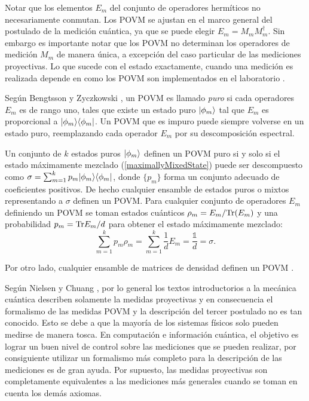 Notar que los elementos $E_m$ del conjunto de operadores hermíticos no necesariamente conmutan. Los POVM se ajustan en el marco general del
postulado de la medición cuántica, ya que se puede elegir $E_m=M_m
M_m^{\dagger}$. Sin embargo es importante notar que los POVM no determinan los
operadores de medición $M_m$ de manera única, a excepción del caso particular
de las mediciones proyectivas. Lo que sucede con el estado exactamente, cuando
una medición es realizada depende en como los POVM son implementados en el
laboratorio {\cite{2007geometry}}.   

Según Bengtsson y Zyczkowski {\cite{2007geometry}}, un POVM es llamado \textit{puro} si cada operadores $E_m$ es de rango uno, tales que existe un estado puro $|\phi_m\rangle$ tal que $E_m$ es proporcional a $|\phi_m\rangle \langle\phi_m|$. Un POVM que es impuro puede siempre volverse en un estado puro, reemplazando cada operador $E_m$ por su descomposición espectral. 

Un conjunto de $k$ estados puros $|\phi_m \rangle$ definen un POVM puro si y solo si el estado máximamente mezclado (\ref{maximallyMixedState}) puede ser descompuesto como  $\sigma=\sum_{m=1}^{k}p_m|\phi_m\rangle \langle\phi_m|$, donde $\{p_m\}$ forma un conjunto adecuado de coeficientes positivos. De hecho cualquier ensamble de estados puros o mixtos representando a $\sigma$ definen un POVM\@. Para cualquier conjunto de operadores $E_m$ definiendo un POVM se toman estados
cuánticos $\rho_m=E_m/{\rm Tr}(E_m)$ y una probabilidad $p_m={\rm Tr} E_m/d$ para obtener
el estado máximamente mezclado: 
\begin{equation}
	\sum_{m=1}^{k} p_m\rho _{m}=\sum_{m=1}^k \dfrac{1}{d}E_m=\dfrac{\mathds{1}}{d}=\sigma.
\end{equation}

Por otro lado, cualquier ensamble de matrices de densidad definen un POVM
{\cite{2007geometry}}.


Según Nielsen y Chuang {\cite{nielsen_chuang_2010}}, por lo general los textos introductorios a la mecánica cuántica describen solamente la medidas proyectivas y en consecuencia el formalismo de las medidas POVM y la descripción del tercer postulado no es tan conocido. Esto se debe a que la mayoría de los sistemas físicos solo pueden medirse de manera tosca. En computación e información cuántica, el objetivo es lograr un buen nivel de control sobre las mediciones que se pueden realizar, por consiguiente utilizar un formalismo más completo para la descripción de las mediciones es de gran ayuda. Por supuesto, las medidas proyectivas son completamente equivalentes a las mediciones más generales cuando se toman en cuenta los demás axiomas.


